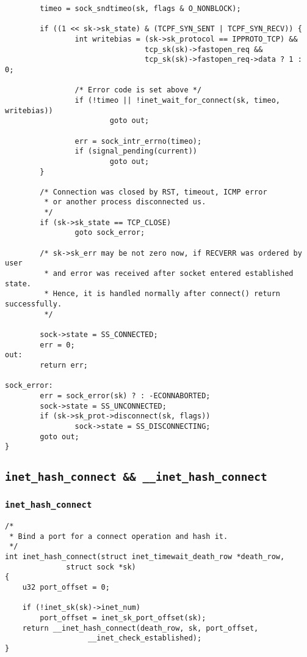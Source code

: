 \begin{verbatim}
        timeo = sock_sndtimeo(sk, flags & O_NONBLOCK);

        if ((1 << sk->sk_state) & (TCPF_SYN_SENT | TCPF_SYN_RECV)) {
                int writebias = (sk->sk_protocol == IPPROTO_TCP) &&
                                tcp_sk(sk)->fastopen_req &&
                                tcp_sk(sk)->fastopen_req->data ? 1 : 0;

                /* Error code is set above */
                if (!timeo || !inet_wait_for_connect(sk, timeo, writebias))
                        goto out;

                err = sock_intr_errno(timeo);
                if (signal_pending(current))
                        goto out;
        }

        /* Connection was closed by RST, timeout, ICMP error
         * or another process disconnected us.
         */
        if (sk->sk_state == TCP_CLOSE)
                goto sock_error;

        /* sk->sk_err may be not zero now, if RECVERR was ordered by user
         * and error was received after socket entered established state.
         * Hence, it is handled normally after connect() return successfully.
         */

        sock->state = SS_CONNECTED;
        err = 0;
out:
        return err;

sock_error:
        err = sock_error(sk) ? : -ECONNABORTED;
        sock->state = SS_UNCONNECTED;
        if (sk->sk_prot->disconnect(sk, flags))
                sock->state = SS_DISCONNECTING;
        goto out;
}
\end{verbatim}
    
\subsection{\texttt{inet_hash_connect && __inet_hash_connect}}

\subsubsection{\texttt{inet_hash_connect}}
\begin{verbatim}
/*
 * Bind a port for a connect operation and hash it.
 */
int inet_hash_connect(struct inet_timewait_death_row *death_row,
              struct sock *sk)
{
    u32 port_offset = 0;

    if (!inet_sk(sk)->inet_num)
        port_offset = inet_sk_port_offset(sk);
    return __inet_hash_connect(death_row, sk, port_offset,
                   __inet_check_established);
}
\end{verbatim}

